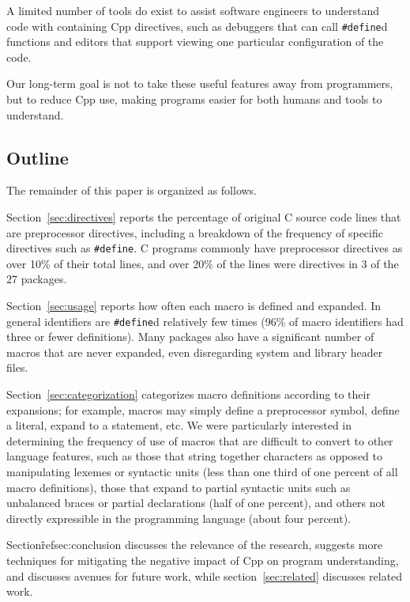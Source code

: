\documentclass[11pt]{article}
\def\numpackages{27}
\begin{document}

A limited number of tools do exist to assist software engineers to
understand code with containing Cpp directives, such as debuggers that can
call {\tt \#define}d functions and editors that support viewing one
particular configuration of the code.

Our long-term goal is not to take these useful features away from
programmers, but to reduce Cpp use, making programs easier for both humans
and tools to understand.


\subsection{Outline}

The remainder of this paper is organized as follows.

Section~\ref{sec:directives} reports the percentage of original C source
code lines that are preprocessor directives, including a breakdown of the
frequency of specific directives such as {\tt \#define}.  C programs
commonly have preprocessor directives as over 10\% of their total lines,
and over 20\% of the lines were directives in 3 of the {\numpackages}
packages.

Section~\ref{sec:usage} reports how often each macro is defined and
expanded.  In general identifiers are {\tt \#define}d relatively few times
(96\% of macro identifiers had three or fewer definitions).  Many packages
also have a significant number of macros that are never expanded, even
disregarding system and library header files.

Section~\ref{sec:categorization} categorizes macro definitions according to
their expansions; for example, macros may simply define a preprocessor
symbol, define a literal, expand to a statement, etc.  We were particularly
interested in determining the frequency of use of macros that are difficult
to convert to other language features, such as those that string together
characters as opposed to manipulating lexemes or syntactic units (less than
one third of one percent of all macro definitions),
those that expand to partial syntactic units such as unbalanced
braces or partial declarations (half of one percent), and others not 
directly expressible in the programming language (about four percent).

Section\~ref{sec:conclusion} discusses the relevance of the research,
suggests more techniques for mitigating the negative impact of Cpp on
program understanding, and discusses avenues for future work, while
section~\ref{sec:related} discusses related work.
\end{document}
